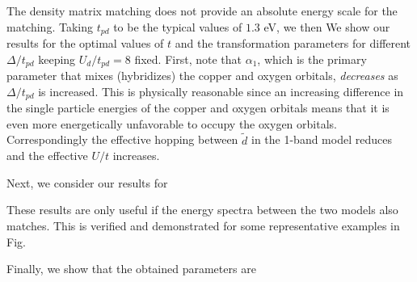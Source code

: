 \documentclass[prl,12pt,onecolumn,nofootinbib,notitlepage,english,superscriptaddress]{revtex4-1}
\begin{document}
The density matrix matching does not provide an absolute energy scale for the matching. 
Taking $t_{pd}$ to be the typical values of $1.3$ eV, we then 
We show our results for the optimal values of $t$ and the transformation parameters for different $\Delta/t_{pd}$
keeping $U_d/t_{pd}=8$ fixed. First, note that $\alpha_1$, which is the primary parameter that mixes (hybridizes) 
the copper and oxygen orbitals, \emph{decreases} as $\Delta/t_{pd}$ is increased. This is physically reasonable 
since an increasing difference in the single particle energies of the copper and oxygen orbitals 
means that it is even more energetically unfavorable to occupy the oxygen orbitals. 
Correspondingly the effective hopping between $\tilde{d}$ in the 
1-band model reduces and the effective $U/t$ increases. 

Next, we consider our results for  

These results are only useful if the energy spectra between the two models also matches. This is verified 
and demonstrated for some representative examples in Fig.        
 
Finally, we show that the obtained parameters are 
\end{document}
